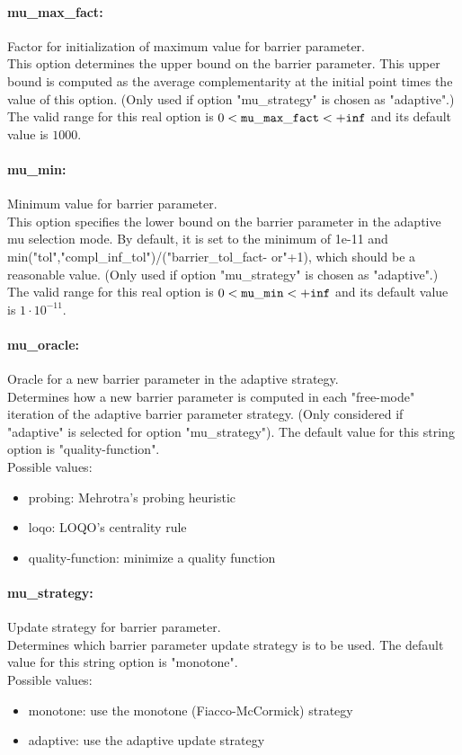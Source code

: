 \paragraph{mu\_max\_fact:}\label{sec:mu_max_fact} Factor for initialization of maximum value for barrier parameter. $\;$ \\
 This option determines the upper bound on the
barrier parameter.  This upper bound is computed
as the average complementarity at the initial
point times the value of this option. (Only used
if option "mu\_strategy" is chosen as "adaptive".) The valid range for this real option is 
$0 <  {\tt mu\_max\_fact } <  {\tt +inf}$
and its default value is $1000$.


\paragraph{mu\_min:}\label{sec:mu_min} Minimum value for barrier parameter. $\;$ \\
 This option specifies the lower bound on the
barrier parameter in the adaptive mu selection
mode. By default, it is set to the minimum of
1e-11 and
min("tol","compl\_inf\_tol")/("barrier\_tol\_fact-
or"+1), which should be a reasonable value. (Only
used if option "mu\_strategy" is chosen as
"adaptive".) The valid range for this real option is 
$0 <  {\tt mu\_min } <  {\tt +inf}$
and its default value is $1 \cdot 10^{-11}$.


\paragraph{mu\_oracle:}\label{sec:mu_oracle} Oracle for a new barrier parameter in the adaptive strategy. $\;$ \\
 Determines how a new barrier parameter is
computed in each "free-mode" iteration of the
adaptive barrier parameter strategy. (Only
considered if "adaptive" is selected for option
"mu\_strategy").
The default value for this string option is "quality-function".
\\ 
Possible values:
\begin{itemize}
   \item probing: Mehrotra's probing heuristic
   \item loqo: LOQO's centrality rule
   \item quality-function: minimize a quality function
\end{itemize}

\paragraph{mu\_strategy:}\label{sec:mu_strategy} Update strategy for barrier parameter. $\;$ \\
 Determines which barrier parameter update
strategy is to be used.
The default value for this string option is "monotone".
\\ 
Possible values:
\begin{itemize}
   \item monotone: use the monotone (Fiacco-McCormick) strategy
   \item adaptive: use the adaptive update strategy
\end{itemize}

